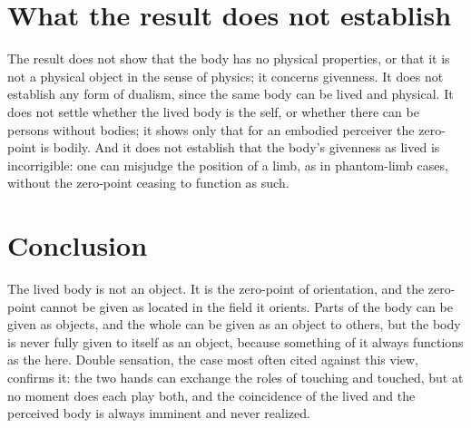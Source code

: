 \documentclass{situationist-preprint}
\begin{document}
\section{What the result does not establish}

The result does not show that the body has no physical properties, or that it is not a physical object in the sense of physics; it concerns givenness. It does not establish any form of dualism, since the same body can be lived and physical. It does not settle whether the lived body is the self, or whether there can be persons without bodies; it shows only that for an embodied perceiver the zero-point is bodily. And it does not establish that the body's givenness as lived is incorrigible: one can misjudge the position of a limb, as in phantom-limb cases, without the zero-point ceasing to function as such.

\section{Conclusion}

The lived body is not an object. It is the zero-point of orientation, and the zero-point cannot be given as located in the field it orients. Parts of the body can be given as objects, and the whole can be given as an object to others, but the body is never fully given to itself as an object, because something of it always functions as the here. Double sensation, the case most often cited against this view, confirms it: the two hands can exchange the roles of touching and touched, but at no moment does each play both, and the coincidence of the lived and the perceived body is always imminent and never realized.
\end{document}
